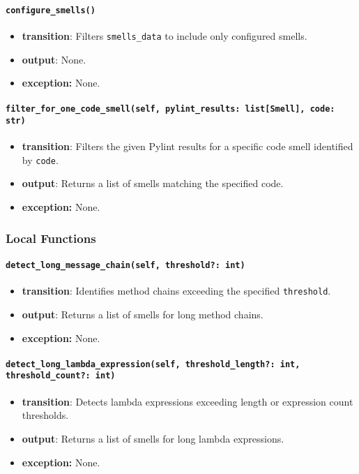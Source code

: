 \documentclass[12pt, titlepage]{article}
\begin{document}
\paragraph{\texttt{configure\_smells()}}
\begin{itemize}
  \item \textbf{transition}: Filters \texttt{smells\_data} to include only configured smells.
  \item \textbf{output}: None.
  \item \textbf{exception:} None.
\end{itemize}

\paragraph{\texttt{filter\_for\_one\_code\_smell(self, pylint\_results: list[Smell], code: str)}}
\begin{itemize}
  \item \textbf{transition}: Filters the given Pylint results for a specific code smell identified by \texttt{code}.
  \item \textbf{output}: Returns a list of smells matching the specified code.
  \item \textbf{exception:} None.
\end{itemize}

\subsubsection{Local Functions}
\paragraph{\texttt{detect\_long\_message\_chain(self, threshold?: int)}}
\begin{itemize}
  \item \textbf{transition}: Identifies method chains exceeding the specified \texttt{threshold}.
  \item \textbf{output}: Returns a list of smells for long method chains.
  \item \textbf{exception:} None.
\end{itemize}

\paragraph{\texttt{detect\_long\_lambda\_expression(self, threshold\_length?: int, threshold\_count?: int)}}
\begin{itemize}
  \item \textbf{transition}: Detects lambda expressions exceeding length or expression count thresholds.
  \item \textbf{output}: Returns a list of smells for long lambda expressions.
  \item \textbf{exception:} None.
\end{itemize}
\end{document}
